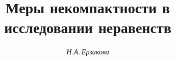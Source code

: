 

 


%  


\newcommand{\down}[2]{\underset{#1}{#2}{}} 


\newcommand{\sign}{\operatorname{sign}} 


\newcommand{\supp}{\operatorname{supp}} 


\newcommand{\tts}[1]{} 


 




 


\setcounter{page}{3} 












 


\author{\it Н.А.\,Ерзакова} 




\title{Меры некомпактности в исследовании неравенств} 


 


\date{} 




\pagestyle{plain} %


 




\maketitle 


